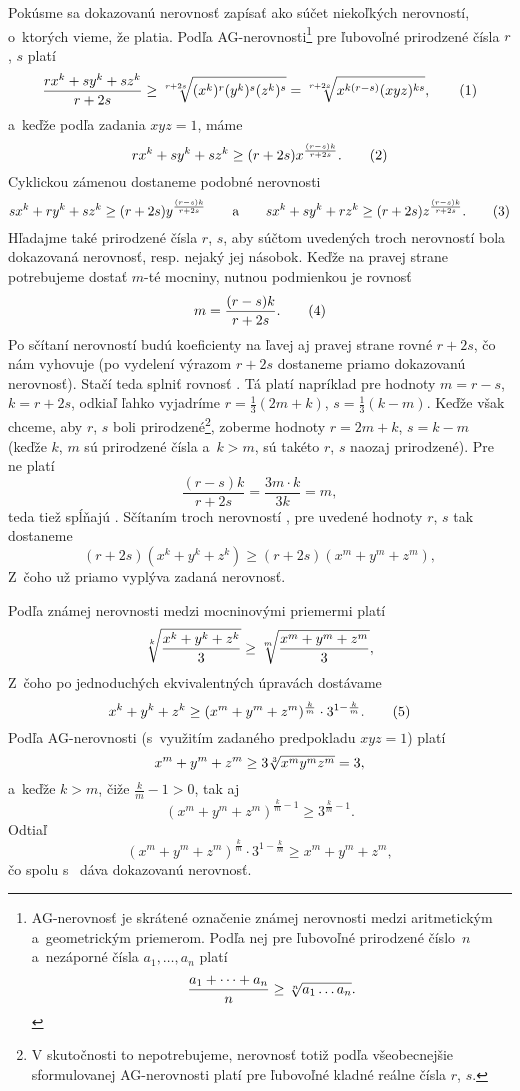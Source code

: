 {%
Pokúsme sa dokazovanú nerovnosť zapísať ako súčet niekoľkých nerovností, o~ktorých vieme, že platia.
Podľa AG-nerovnosti\dorocenky{\global\edef\strankaAG{\the\pageno}}\footnote{AG-nerovnosť je skrátené označenie známej nerovnosti medzi aritmetickým a~geometrickým priemerom. Podľa nej pre ľubovoľné prirodzené číslo~$n$ a~nezáporné čísla $a_1,\dots,a_n$ platí $$\frac{a_1+\cdots+a_n}n\ge\root n\of{a_1\dots a_n}.$$ } pre ľubovoľné prirodzené čísla $r$, $s$ platí
$$
\frac{rx^k+sy^k+sz^k}{r+2s} \ge \root{r+2s}\of{(x^k)^r(y^k)^s(z^k)^s}=\root{r+2s}\of{x^{k(r-s)}(xyz)^{ks}},
\tag1
$$
a~keďže podľa zadania $xyz=1$, máme
$$
rx^k+sy^k+sz^k \ge (r+2s)x^{\frac{(r-s)k}{r+2s}}.
\tag2
$$
Cyklickou zámenou dostaneme podobné nerovnosti
$$
sx^k+ry^k+sz^k \ge (r+2s)y^{\frac{(r-s)k}{r+2s}}\qquad\text{a}\qquad
sx^k+sy^k+rz^k \ge (r+2s)z^{\frac{(r-s)k}{r+2s}}.
\tag3
$$
Hľadajme také prirodzené čísla $r$, $s$, aby súčtom uvedených troch nerovností bola dokazovaná nerovnosť, resp. nejaký jej násobok. Keďže na pravej strane potrebujeme dostať $m$-té mocniny, nutnou podmienkou je rovnosť
$$
m=\frac{(r-s)k}{r + 2s}.\tag4
$$
Po sčítaní nerovností budú koeficienty na ľavej aj pravej strane rovné $r+2s$, čo nám vyhovuje (po vydelení výrazom $r+2s$ dostaneme priamo dokazovanú nerovnosť). Stačí teda splniť rovnosť . Tá platí napríklad pre hodnoty $m=r-s$, $k=r+2s$, odkiaľ ľahko vyjadríme $r=\frac13(2m+k)$, $s=\frac13(k-m)$. Keďže však chceme, aby $r$, $s$ boli prirodzené\footnote{V skutočnosti to nepotrebujeme, nerovnosť  totiž podľa všeobecnejšie sformulovanej AG-nerovnosti platí pre ľubovoľné kladné reálne čísla $r$, $s$.}, zoberme hodnoty $r=2m+k$, $s=k-m$ (keďže $k$, $m$ sú prirodzené čísla a~$k>m$, sú takéto $r$, $s$ naozaj prirodzené). Pre ne platí
$$
\frac{(r-s)k}{r+2s}=\frac{3m\cdot k}{3k}=m,
$$
teda tiež spĺňajú . Sčítaním troch nerovností ,  pre uvedené hodnoty $r$, $s$ tak dostaneme
$$
(r+2s)(x^k + y^k + z^k)\ge(r+2s)(x^m + y^m + z^m),
$$
Z~čoho už priamo vyplýva zadaná nerovnosť.

\ineriesenie
Podľa známej nerovnosti medzi mocninovými priemermi platí
$$
\root k\of{\frac{x^k+y^k+z^k}3}\ge\root m\of{\frac{x^m+y^m+z^m}3},
$$
Z~čoho po jednoduchých ekvivalentných úpravách dostávame
$$
x^k+y^k+z^k\ge(x^m+y^m+z^m)^{\frac km}\cdot 3^{1-\frac km}.\tag5
$$
Podľa AG-nerovnosti (s~využitím zadaného predpokladu $xyz=1$) platí
$$
x^m+y^m+z^m\ge3\root 3\of{x^my^mz^m}=3,
$$
a~keďže $k>m$, čiže $\frac km-1>0$, tak aj
$$
(x^m+y^m+z^m)^{\frac km-1}\ge 3^{\frac km-1}.
$$
Odtiaľ
$$
(x^m+y^m+z^m)^{\frac km}\cdot 3^{1-\frac km}\ge x^m+y^m+z^m,
$$
čo spolu s~ dáva dokazovanú nerovnosť.
}

